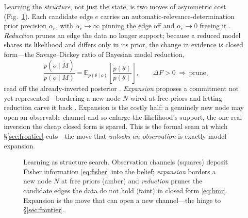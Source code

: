 \documentclass[11pt]{article}
\newcommand{\Eq}[2]{\mathbb{E}_{#1}\!\left[#2\right]}
\theoremstyle{definition}
\theoremstyle{plain}
\begin{document}
Learning the \emph{structure}, not just the state, is two moves of asymmetric cost
(Fig.~\ref{fig:pgm}). Each candidate edge $e$ carries an automatic-relevance-determination prior
precision $\alpha_e$, with $\alpha_e\!\to\!\infty$ pinning the edge off and $\alpha_e\!\to\!0$ freeing
it \citep{mackay1992,neal1996,tipping2001}. \emph{Reduction} prunes an edge the data no longer
support; because a reduced model shares its likelihood and differs only in its prior, the change in
evidence is closed form---the Savage--Dickey ratio of Bayesian model reduction,
\begin{equation}
\frac{p(o\mid\tilde M)}{p(o\mid M)}=\Eq{p(\theta\mid o)}{\frac{\tilde p(\theta)}{p(\theta)}},
\qquad \Delta F>0\ \Rightarrow\ \text{prune},
\label{eq:bmr}
\end{equation}
read off the already-inverted posterior \citep{friston2018bmr}. \emph{Expansion} proposes a
commitment not yet represented---bordering a new node $N$ wired at free priors and letting reduction
carve it back \citep{friston2017curiosity}. Expansion is the costly half: a genuinely new node may
open an observable channel and so enlarge the likelihood's support, the one real inversion the cheap
closed form is spared. This is the formal seam at which \S\ref{sec:frontier} cuts---the move that
\emph{unlocks an observation} is exactly model expansion.

\begin{figure}[h]
\centering
{}
\caption{Learning as structure search. Observation channels (squares) deposit Fisher information
\eqref{eq:fisher} into the belief; \emph{expansion} borders a new node $N$ at free priors (amber) and
\emph{reduction} prunes the candidate edges the data do not hold (faint) in closed form
\eqref{eq:bmr}. Expansion is the move that can open a new channel---the hinge to
\S\ref{sec:frontier}.}
\label{fig:pgm}
\end{figure}
\end{document}
